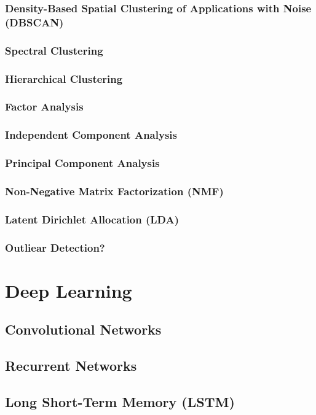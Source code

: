 \documentclass[11pt]{article}
\begin{document}
\subsubsection{Density-Based Spatial Clustering of Applications with Noise (DBSCAN)}
\subsubsection{Spectral Clustering}
\subsubsection{Hierarchical Clustering}
\subsubsection{Factor Analysis}
\subsubsection{Independent Component Analysis}
\subsubsection{Principal Component Analysis}
\subsubsection{Non-Negative Matrix Factorization (NMF)}
\subsubsection{Latent Dirichlet Allocation (LDA)}
\subsubsection{Outliear Detection?}

\section{Deep Learning}
\subsection{Convolutional Networks}
\subsection{Recurrent Networks}
\subsection{Long Short-Term Memory (LSTM)}
\end{document}
